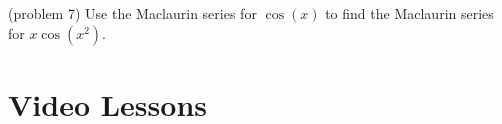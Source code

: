 \documentclass{ximera}
\begin{document}
\begin{problem}(problem 7)
Use the Maclaurin series for $\cos(x)$ to find the Maclaurin series for $x \cos(x^2)$.
\begin{multipleChoice}
\end{multipleChoice}
\end{problem}


\section{Video Lessons}


\begin{center}
\begin{foldable}
\end{foldable}
\end{center}
\end{document}
